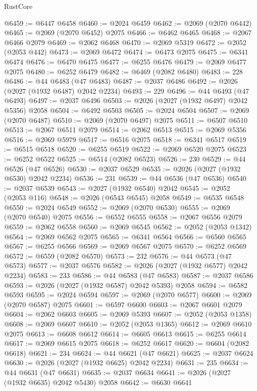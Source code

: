 \begin{lexlean}{RustCore}
\begin{coremodule}
@6459 := @6447 @6458
@6460 := @2024 @6459
@6462 := @2069 (@2070 @6442)
@6465 := @2069 (@2070 @6452) @2075
@6466 := @6462 @6465
@6468 := @2067 @6466 @2079
@6469 := @2062 @6468
@6470 := @2069 @5319
@6472 := @2052 (@2053 @442)
@6473 := @2069 @6472
@6474 := @6473 @2075
@6475 := @6341 @6474
@6476 := @6470 @6475
@6477 := @6255 @6476
@6479 := @2069 @6477 @2075
@6480 := @6252 @6479
@6482 := @6469 (@2082 @6480)
@6483 := 228
@6486 := @44 @6483 (@47 @6483)
@6487 := @2037 @6486
@6492 := @2026 (@2027 (@1932 @6487) @2042 @2234)
@6493 := 229
@6496 := @44 @6493 (@47 @6493)
@6497 := @2037 @6496
@6503 := @2026 (@2027 (@1932 @6497) @2042 @5356) @2058
@6504 := @6492 @6503
@6505 := @2024 @6504
@6507 := @2069 (@2070 @6487)
@6510 := @2069 (@2070 @6497) @2075
@6511 := @6507 @6510
@6513 := @2067 @6511 @2079
@6514 := @2062 @6513
@6515 := @2069 @5356
@6516 := @2069 @5979
@6517 := @6516 @2075
@6518 := @6341 @6517
@6519 := @6515 @6518
@6520 := @6255 @6519
@6522 := @2069 @6520 @2075
@6523 := @6252 @6522
@6525 := @6514 (@2082 @6523)
@6526 := 230
@6529 := @44 @6526 (@47 @6526)
@6530 := @2037 @6529
@6535 := @2026 (@2027 (@1932 @6530) @2042 @2234)
@6536 := 231
@6539 := @44 @6536 (@47 @6536)
@6540 := @2037 @6539
@6543 := @2027 (@1932 @6540) @2042
@6545 := @2052 (@2053 @116)
@6548 := @2026 (@6543 @6545) @2058
@6549 := @6535 @6548
@6550 := @2024 @6549
@6552 := @2069 (@2070 @6530)
@6555 := @2069 (@2070 @6540) @2075
@6556 := @6552 @6555
@6558 := @2067 @6556 @2079
@6559 := @2062 @6558
@6560 := @2069 @6545
@6562 := @2052 (@2053 @1342)
@6564 := @2069 @6562 @2075
@6565 := @6341 @6564
@6566 := @6560 @6565
@6567 := @6255 @6566
@6569 := @2069 @6567 @2075
@6570 := @6252 @6569
@6572 := @6559 (@2082 @6570)
@6573 := 232
@6576 := @44 @6573 (@47 @6573)
@6577 := @2037 @6576
@6582 := @2026 (@2027 (@1932 @6577) @2042 @2234)
@6583 := 233
@6586 := @44 @6583 (@47 @6583)
@6587 := @2037 @6586
@6593 := @2026 (@2027 (@1932 @6587) @2042 @5393) @2058
@6594 := @6582 @6593
@6595 := @2024 @6594
@6597 := @2069 (@2070 @6577)
@6600 := @2069 (@2070 @6587) @2075
@6601 := @6597 @6600
@6603 := @2067 @6601 @2079
@6604 := @2062 @6603
@6605 := @2069 @5393
@6607 := @2052 (@2053 @1358)
@6608 := @2069 @6607
@6610 := @2052 (@2053 @1365)
@6612 := @2069 @6610 @2075
@6613 := @6608 @6612
@6614 := @6605 @6613
@6615 := @6255 @6614
@6617 := @2069 @6615 @2075
@6618 := @6252 @6617
@6620 := @6604 (@2082 @6618)
@6621 := 234
@6624 := @44 @6621 (@47 @6621)
@6625 := @2037 @6624
@6630 := @2026 (@2027 (@1932 @6625) @2042 @2234)
@6631 := 235
@6634 := @44 @6631 (@47 @6631)
@6635 := @2037 @6634
@6641 := @2026 (@2027 (@1932 @6635) @2042 @5430) @2058
@6642 := @6630 @6641

\end{coremodule}
\end{lexlean}
